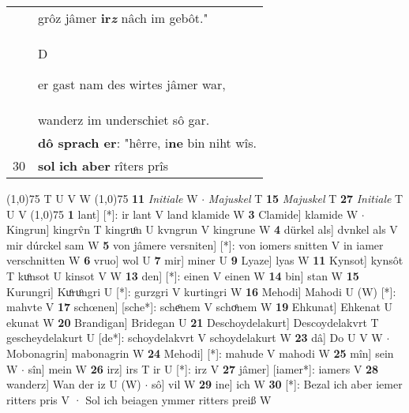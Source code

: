 \documentclass[8pt,a4paper,notitlepage]{article}
\begin{document}
\begin{table}[ht]
\begin{minipage}[t]{0.5\linewidth}
\begin{tabular}{rl}
 & grôz jâmer \textbf{ir\textit{z}} nâch im gebôt."\\ 
 & \begin{large}D\end{large}er gast nam des wirtes jâmer war,\\ 
 & wanderz im underschiet sô gar.\\ 
 & \textbf{dô sprach er}: "hêrre, i\textbf{ne} bin niht wîs.\\ 
30 & \textbf{sol} \textbf{ich aber} rîters prîs\\ 
\end{tabular}
\scriptsize
\line(1,0){75} \newline
T U V W \newline
\line(1,0){75} \newline
\textbf{11} \textit{Initiale} W   $\cdot$ \textit{Majuskel} T  \textbf{15} \textit{Majuskel} T  \textbf{27} \textit{Initiale} T U V  \newline
\line(1,0){75} \newline
\textbf{1} lant] [*]: ir lant V land klamide W \textbf{3} Clamide] klamide W  $\cdot$ Kingrun] kingrv̂n T kingruͦn U kvngrun V kingrune W \textbf{4} dürkel als] dvnkel als V mir dúrckel sam W \textbf{5} von jâmere versniten] [*]: von iomers snitten V in iamer verschnitten W \textbf{6} vruo] wol U \textbf{7} mir] miner U \textbf{9} Lyaze] lyas W \textbf{11} Kynsot] kynsôt T kuͦnsot U kinsot V W \textbf{13} den] [*]: einen V einen W \textbf{14} bin] stan W \textbf{15} Kurungri] Kuͦruͦngri U [*]: gurzgri V kurtingri W \textbf{16} Mehodi] Mahodi U (W) [*]: mahvte  V \textbf{17} schœnen] [sche*]: scheͦnem V schoͤnem W \textbf{19} Ehkunat] Ehkenat U ekunat W \textbf{20} Brandigan] Bridegan U \textbf{21} Deschoydelakurt] Descoydelakvrt T gescheydelakurt U [de*]: schoydelakvrt V schoydelakurt W \textbf{23} dâ] Do U V W  $\cdot$ Mobonagrin] mabonagrin W \textbf{24} Mehodi] [*]: mahude V mahodi W \textbf{25} mîn] sein W  $\cdot$ sîn] mein W \textbf{26} irz] irs T ir U [*]: irz V \textbf{27} jâmer] [iamer*]: iamers V \textbf{28} wanderz] Wan der iz U (W)  $\cdot$ sô] vil W \textbf{29} ine] ich W \textbf{30} [*]: Bezal ich aber iemer ritters pris V · Sol ich beiagen ymmer ritters preiß W \newline
\end{minipage}
\end{table}
\end{document}
